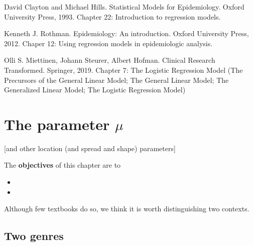 \documentclass[]{book}
\begin{document}
David Clayton and Michael Hills. Statistical Models for Epidemiology. Oxford University Press, 1993. Chapter 22: Introduction to regression models.

Kenneth J. Rothman. Epidemiology: An introduction.
Oxford University Press, 2012. Chaper 12: Using regression models in epidemiologic analysis.

Olli S. Miettinen, Johann Steurer, Albert Hofman.
Clinical Research Transformed. Springer, 2019.
Chapter 7: The Logistic Regression Model (The Precursors of the General Linear Model; The General Linear Model; The Generalized Linear Model; The Logistic Regression Model)

\hypertarget{paraMu}{%
\chapter{\texorpdfstring{The parameter \(\mu\)}{The parameter \textbackslash{}mu}}\label{paraMu}}

{[}and other location (and spread and shape) parameters{]}

The \textbf{objectives} of this chapter are to

\begin{itemize}
\item
\item
\end{itemize}

Although few textbooks do so, we think it is worth distinguishing two contexts.

\hypertarget{two-genres-1}{%
\section{Two genres}\label{two-genres-1}}
\end{document}
